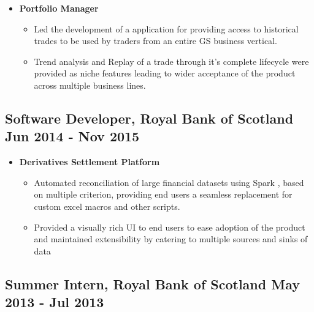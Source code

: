 \begin{itemize}[label=\textperiodcentered,labelindent=0pt,itemindent=1em,leftmargin=0.3cm,itemsep=0pt]
\begin{itemize}[label=\textperiodcentered,itemindent=1em,leftmargin=0.3cm,itemsep=0pt]
        \item \textbf{Portfolio Manager}
            \begin{itemize}
                \item {Led the development of a application for providing access to historical trades to be used by traders from an entire GS business vertical.}
                \item {Trend analysis and Replay of a trade through it's complete lifecycle were provided as niche features leading to wider acceptance of the product across multiple business lines. }
            \end{itemize}
    \end{itemize}
    
\end{itemize}
\subsection*{\small{Software Developer, Royal Bank of Scotland \hfill Jun 2014 - Nov 2015}}
\begin{itemize}[label=\textperiodcentered,labelindent=0pt,itemindent=1em,leftmargin=0.3cm,itemsep=0pt]
    \begin{itemize}
        \item \textbf{Derivatives Settlement Platform}
            \begin{itemize}
                \item {Automated reconciliation of large financial datasets using Spark , based on multiple criterion, providing end users a seamless replacement for custom excel macros and other scripts.}
                \item {Provided a visually rich UI to end users to ease adoption of the product and maintained extensibility by catering to multiple sources and sinks of data}
            \end{itemize}
    \end{itemize}
\end{itemize}
\subsection*{\small{Summer Intern, Royal Bank of Scotland \hfill May 2013 - Jul 2013}}

